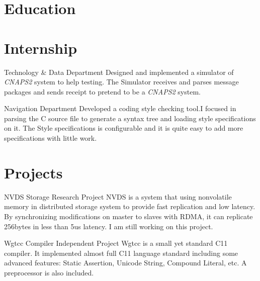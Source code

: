 \documentclass[11pt,a4paper]{moderncv}
\begin{document}
\makecvtitle

\section{Education}


\section{Internship}
{Technology \& Data Department}
{}{}{
	Designed and implemented a simulator of \textsl{CNAPS2} system to help testing.
	The Simulator receives and parses message packages and sends receipt
	to pretend to be a \textsl{CNAPS2} system.
}

{Navigation Department}
{}{}{
	Developed a coding style checking tool.I focused in parsing the C source file to generate a
	syntax tree and loading style specifications on it. The Style specifications is configurable
	and it is quite easy to add more specifications with little work.
}

\section{Projects}
{NVDS}
{Storage}
{Research Project}{}{
	NVDS is a system that using nonvolatile memory in distributed storage system to provide fast replication and low latency. By synchronizing modifications on master to slaves with RDMA, it can replicate 256bytes in less than 5us
	latency. I am still working on this project.
}

{Wgtcc}
{Compiler}
{Independent Project}{}{
	Wgtcc is a small yet standard C11 compiler. It implemented almost full C11 language standard including some advanced features: Static Assertion, Unicode String, Compound Literal, etc. A preprocessor is also included. 
}
\end{document}
